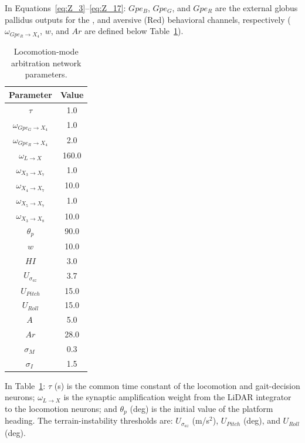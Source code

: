 In Equations~\eqref{eq:Z_3}--\eqref{eq:Z_17}: $Gpe_B$, $Gpe_G$, and $Gpe_R$ are the external globus pallidus outputs for the , and aversive (Red) behavioral channels, respectively ($\omega_{Gpe_R \rightarrow X_4}$, $w$, and $Ar$ are defined below Table~\ref{table:Locom_NN}).

\begin{table}[t]
\centering
\caption{Locomotion-mode arbitration network parameters.}
\begin{tabular}{|c|c|}
\hline
\textbf{Parameter} & \textbf{Value} \\ \hline
$\tau$ & 1.0 \\ \hline

$\omega_{Gpe_G \rightarrow X_4}$ & 1.0 \\ \hline
$\omega_{Gpe_R \rightarrow X_4}$ & 2.0 \\ \hline

$\omega_{L \rightarrow X}$ & 160.0 \\ \hline

$\omega_{X_3 \rightarrow X_7}$ & 1.0 \\ \hline
$\omega_{X_4 \rightarrow X_7}$ & 10.0 \\ \hline
$\omega_{X_5 \rightarrow X_7}$ & 1.0 \\ \hline

$\omega_{X_3 \rightarrow X_8}$ & 10.0 \\ \hline

$\theta_{p}$ & 90.0 \\ \hline

$w$ & 10.0 \\ \hline

$HI$ & 3.0 \\ \hline

$U_{\sigma_{az}}$ & 3.7 \\ \hline
$U_{Pitch}$ & 15.0 \\ \hline
$U_{Roll}$ & 15.0 \\ \hline
$A\ $ & 5.0 \\ \hline
$ Ar $ & 28.0 \\ \hline
$\sigma_{M}\ $ & 0.3 \\ \hline
$\sigma_{I}\ $ & 1.5 \\ \hline
\end{tabular}
\label{table:Locom_NN}
\end{table}

In Table~\ref{table:Locom_NN}: $\tau$ (s) is the common time constant of the locomotion and gait-decision neurons; $\omega_{L\rightarrow X}$ is the synaptic amplification weight from the LiDAR integrator to the locomotion neurons; and $\theta_{p}$ (deg) is the initial value of the platform heading.
The terrain-instability thresholds are: $U_{\sigma_{az}}$ (m/s$^2$), $U_{Pitch}$ (deg), and $U_{Roll}$ (deg).

